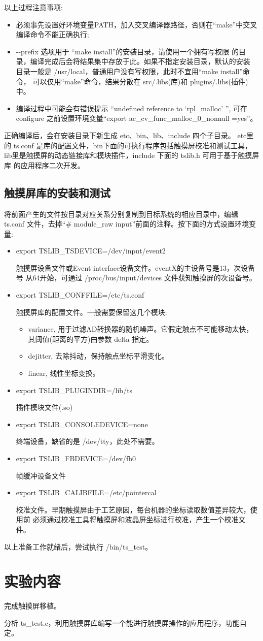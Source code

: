 	以上过程注意事项:
\begin{itemize}
  \item 必须事先设置好环境变量PATH，加入交叉编译器路径，否则在``make''中交叉
	编译命令不能正确执行;
  \item -{}-prefix 选项用于 ``make install''的安装目录，请使用一个拥有写权限
	的目录，编译完成后会将结果集中存放于此。如果不指定安装目录，默认的安装
	目录一般是 /usr/local，普通用户没有写权限，此时不宜用``make install''命令，
	可以仅用``make''命令，结果分散在 src/.libs(库)和 plugins/.libs(插件)中。
  \item 编译过程中可能会有错误提示 ``undefined reference to `rpl\_malloc' '',
	可在 configure 之前设置环境变量``export ac\_cv\_func\_malloc\_0\_nonnull
	=yes''。
\end{itemize}

	正确编译后，会在安装目录下新生成 etc、bin、lib、include 四个子目录。
etc里的 ts.conf 是库的配置文件，bin下面的可执行程序包括触摸屏校准和测试工具，
lib里是触摸屏的动态链接库和模块插件，include 下面的 tslib.h 可用于基于触摸屏库
的应用程序二次开发。

\subsection{触摸屏库的安装和测试}
	将前面产生的文件按目录对应关系分别复制到目标系统的相应目录中，编辑 ts.conf
文件，去掉``\# module\_raw input''前面的注释。按下面的方式设置环境变量:

\begin{itemize}\itemsep=-4pt
  \item export TSLIB\_TSDEVICE=/dev/input/event2

	触摸屏设备文件或Event interface设备文件。eventX的主设备号是13，次设备号
从64开始，可通过 /proc/bus/input/devices 文件获知触摸屏的次设备号。
  \item export TSLIB\_CONFFILE=/etc/ts.conf         

	触摸屏库的配置文件。一般需要保留这几个模块:
  \begin{itemize}
    \item variance, 用于过滤AD转换器的随机噪声。它假定触点不可能移动太快，
	其阈值(距离的平方)由参数 delta 指定。
    \item dejitter, 去除抖动，保持触点坐标平滑变化。
    \item linear, 线性坐标变换。
  \end{itemize}
  \item export TSLIB\_PLUGINDIR=/lib/ts

	插件模块文件(.so)
  \item export TSLIB\_CONSOLEDEVICE=none

	终端设备，缺省的是 /dev/tty，此处不需要。
  \item export TSLIB\_FBDEVICE=/dev/fb0

	帧缓冲设备文件
  \item export TSLIB\_CALIBFILE=/etc/pointercal

	校准文件。早期触摸屏由于工艺原因，每台机器的坐标读取数值差异较大，使用前
必须通过校准工具将触摸屏和液晶屏坐标进行校准，产生一个校准文件。
\end{itemize}

	以上准备工作就绪后，尝试执行 /bin/ts\_test。

\section{实验内容}
	完成触摸屏移植。

	分析 ts\_test.c，利用触摸屏库编写一个能进行触摸屏操作的应用程序，功能自定。
